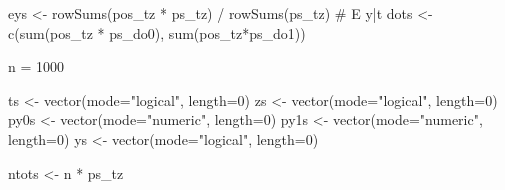 \documentclass[
  letterpaper,
  DIV=11,
  numbers=noendperiod]{scrartcl}
\newenvironment{Shaded}{\begin{snugshade}}{\end{snugshade}}
\newcommand{\AttributeTok}[1]{\textcolor[rgb]{0.40,0.45,0.13}{#1}}
\newcommand{\CommentTok}[1]{\textcolor[rgb]{0.37,0.37,0.37}{#1}}
\newcommand{\DecValTok}[1]{\textcolor[rgb]{0.68,0.00,0.00}{#1}}
\newcommand{\FunctionTok}[1]{\textcolor[rgb]{0.28,0.35,0.67}{#1}}
\newcommand{\NormalTok}[1]{\textcolor[rgb]{0.00,0.23,0.31}{#1}}
\newcommand{\OtherTok}[1]{\textcolor[rgb]{0.00,0.23,0.31}{#1}}
\newcommand{\SpecialCharTok}[1]{\textcolor[rgb]{0.37,0.37,0.37}{#1}}
\newcommand{\StringTok}[1]{\textcolor[rgb]{0.13,0.47,0.30}{#1}}
\begin{document}
\begin{Shaded}
\begin{Highlighting}[]
\NormalTok{eys  }\OtherTok{\textless{}{-}} \FunctionTok{rowSums}\NormalTok{(pos\_tz }\SpecialCharTok{*}\NormalTok{ ps\_tz) }\SpecialCharTok{/} \FunctionTok{rowSums}\NormalTok{(ps\_tz) }\CommentTok{\# E y|t}
\NormalTok{dots }\OtherTok{\textless{}{-}} \FunctionTok{c}\NormalTok{(}\FunctionTok{sum}\NormalTok{(pos\_tz }\SpecialCharTok{*}\NormalTok{ ps\_do0), }\FunctionTok{sum}\NormalTok{(pos\_tz}\SpecialCharTok{*}\NormalTok{ps\_do1))}

\NormalTok{n }\OtherTok{=} \DecValTok{1000}

\NormalTok{ts  }\OtherTok{\textless{}{-}} \FunctionTok{vector}\NormalTok{(}\AttributeTok{mode=}\StringTok{"logical"}\NormalTok{, }\AttributeTok{length=}\DecValTok{0}\NormalTok{)}
\NormalTok{zs  }\OtherTok{\textless{}{-}} \FunctionTok{vector}\NormalTok{(}\AttributeTok{mode=}\StringTok{"logical"}\NormalTok{, }\AttributeTok{length=}\DecValTok{0}\NormalTok{)}
\NormalTok{py0s }\OtherTok{\textless{}{-}} \FunctionTok{vector}\NormalTok{(}\AttributeTok{mode=}\StringTok{"numeric"}\NormalTok{, }\AttributeTok{length=}\DecValTok{0}\NormalTok{)}
\NormalTok{py1s }\OtherTok{\textless{}{-}} \FunctionTok{vector}\NormalTok{(}\AttributeTok{mode=}\StringTok{"numeric"}\NormalTok{, }\AttributeTok{length=}\DecValTok{0}\NormalTok{)}
\NormalTok{ys  }\OtherTok{\textless{}{-}} \FunctionTok{vector}\NormalTok{(}\AttributeTok{mode=}\StringTok{"logical"}\NormalTok{, }\AttributeTok{length=}\DecValTok{0}\NormalTok{)}

\NormalTok{ntots }\OtherTok{\textless{}{-}}\NormalTok{ n }\SpecialCharTok{*}\NormalTok{ ps\_tz}


\end{Highlighting}
\end{Shaded}
\end{document}

